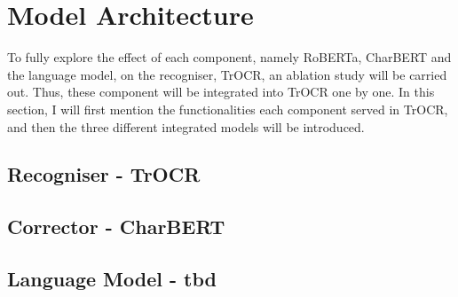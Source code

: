 \section{Model Architecture}
\label{sec:3_model_architecture}
To fully explore the effect of each component, namely RoBERTa, CharBERT and the language model, on the recogniser, TrOCR, an ablation study will be carried out. Thus, these component will be integrated into TrOCR one by one. In this section, I will first mention the functionalities each component served in TrOCR, and then the three different integrated models will be introduced.
\subsection{Recogniser - TrOCR}
\label{subsec:3_recogniser_trocr}

\subsection{Corrector - CharBERT}
\label{subsec:3_corrector_charbert}

\subsection{Language Model - tbd}
\label{subsec:3_language_model_tbd}